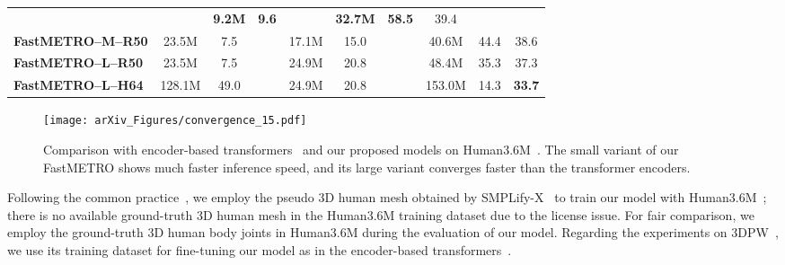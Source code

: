 \begin{table}[t!]
{\begin{tabular}{lccccccccc}
            & \cellcolor{gray!7.5}
            & \cellcolor{gray!7.5}\textbf{9.2M} 
            & \cellcolor{gray!7.5}\textbf{9.6} 
            & \cellcolor{gray!7.5}
            & \cellcolor{gray!7.5}\textbf{32.7M} 
            & \cellcolor{gray!7.5}\textbf{58.5} 
            & \cellcolor{gray!7.5}39.4
        \\
            \cellcolor{gray!7.5}\textbf{FastMETRO--M--R50}
            & \cellcolor{gray!7.5}23.5M 
            & \cellcolor{gray!7.5}7.5 
            & \cellcolor{gray!7.5}
            & \cellcolor{gray!7.5}17.1M 
            & \cellcolor{gray!7.5}15.0 
            & \cellcolor{gray!7.5}
            & \cellcolor{gray!7.5}40.6M 
            & \cellcolor{gray!7.5}44.4 
            & \cellcolor{gray!7.5}38.6
        \\
            \cellcolor{gray!7.5}\textbf{FastMETRO--L--R50}
            & \cellcolor{gray!7.5}23.5M 
            & \cellcolor{gray!7.5}7.5 
            & \cellcolor{gray!7.5}
            & \cellcolor{gray!7.5}24.9M 
            & \cellcolor{gray!7.5}20.8 
            & \cellcolor{gray!7.5}
            & \cellcolor{gray!7.5}48.4M 
            & \cellcolor{gray!7.5}35.3 
            & \cellcolor{gray!7.5}37.3
        \\
            \cellcolor{gray!7.5}\textbf{FastMETRO--L--H64}
            & \cellcolor{gray!7.5}128.1M 
            & \cellcolor{gray!7.5}49.0 
            & \cellcolor{gray!7.5}
            & \cellcolor{gray!7.5}24.9M 
            & \cellcolor{gray!7.5}20.8 
            & \cellcolor{gray!7.5}
            & \cellcolor{gray!7.5}153.0M 
            & \cellcolor{gray!7.5}14.3 
            & \cellcolor{gray!7.5}\textbf{33.7}
        \\
        \hline
    \end{tabular}}
    \label{table:compare_trasnformer}
\end{table}

\begin{figure}[t!]
    \centering
    \texttt{[image: arXiv\_Figures/convergence\_15.pdf]}
    \caption{
    Comparison with encoder-based transformers~\cite{lin2021metro,lin2021graphormer} and our proposed models on Human3.6M~\cite{wang2014h36m}.
    The small variant of our FastMETRO shows much faster inference speed, and its large variant converges faster than the transformer encoders.
    }
    \label{fig:convergence}
\end{figure}

Following the common practice~\cite{choi2020pose2mesh,Moon_2020_ECCV_I2L-MeshNet,lin2021metro,lin2021graphormer}, we employ the pseudo 3D human mesh obtained by \mbox{SMPLify-X}~\cite{pavlakos_2019_smplify_x} to train our model with Human3.6M~\cite{wang2014h36m};
there is no available ground-truth 3D human mesh in the Human3.6M training dataset due to the license issue.
For fair comparison, we employ the ground-truth 3D human body joints in Human3.6M during the evaluation of our model.
Regarding the experiments on 3DPW~\cite{marcard20183dpw}, we use its training dataset for fine-tuning our model as in the encoder-based transformers~\cite{lin2021metro,lin2021graphormer}.

